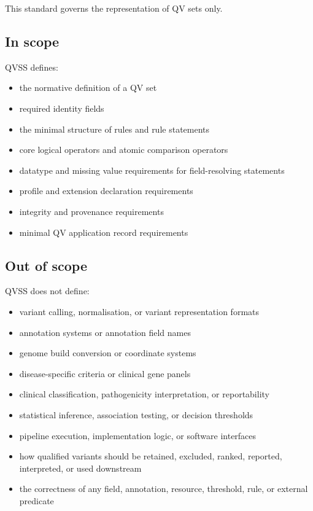 \documentclass[11pt,a4paper]{article}
\begin{document}
This standard governs the representation of QV sets only.

\subsection{In scope}

QVSS defines:

\begin{itemize}
\item the normative definition of a QV set
\item required identity fields
\item the minimal structure of rules and rule statements
\item core logical operators and atomic comparison operators
\item datatype and missing value requirements for field-resolving statements
\item profile and extension declaration requirements
\item integrity and provenance requirements
\item minimal QV application record requirements
\end{itemize}

\subsection{Out of scope}

QVSS does not define:

\begin{itemize}
\item variant calling, normalisation, or variant representation formats
\item annotation systems or annotation field names
\item genome build conversion or coordinate systems
\item disease-specific criteria or clinical gene panels
\item clinical classification, pathogenicity interpretation, or reportability
\item statistical inference, association testing, or decision thresholds
\item pipeline execution, implementation logic, or software interfaces
\item how qualified variants should be retained, excluded, ranked, reported, interpreted, or used downstream
\item the correctness of any field, annotation, resource, threshold, rule, or external predicate
\end{itemize}
\end{document}
